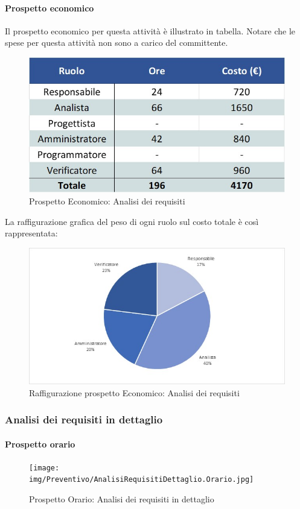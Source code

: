 \paragraph{Prospetto economico}
Il prospetto economico per questa attività è illustrato in tabella. Notare che le spese per questa attività non sono a carico del committente.
\begin{figure}[h!]
	\centerline{\includegraphics[scale=0.4]{img/Preventivo/AnalisiRequisiti.Economico.jpg}}
	\caption{Prospetto Economico: Analisi dei requisiti}
\end{figure}
La raffigurazione grafica del peso di ogni ruolo sul costo totale è così rappresentata: 
\begin{figure}[h!]
	\centerline{\includegraphics[scale=0.4]{img/Preventivo/Torte/AnalisiRequisiti.jpg}}
	\caption{Raffigurazione prospetto Economico: Analisi dei requisiti}
\end{figure}

\subsubsection{Analisi dei requisiti in dettaglio}
\paragraph{Prospetto orario}
\begin{figure}[h!]
	\centerline{\texttt{[image: img/Preventivo/AnalisiRequisitiDettaglio.Orario.jpg]}}
	\caption{Prospetto Orario: Analisi dei requisiti in dettaglio}
\end{figure}
